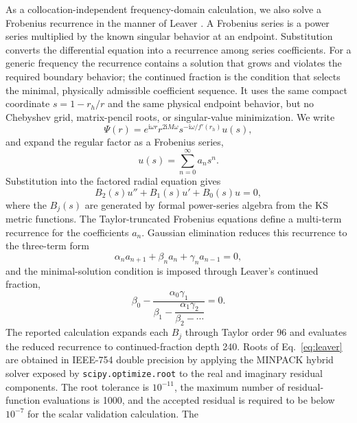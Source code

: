 \documentclass[12pt,a4paper]{article}
\newcommand{\ii}{\mathrm{i}}
\begin{document}
\color{blue}
As a collocation-independent frequency-domain calculation, we also solve a Frobenius
recurrence in the manner of Leaver \cite{Leaver1985,Nollert1993}.  A Frobenius
series is a power series multiplied by the known singular behavior at an
endpoint.  Substitution converts the differential equation into a recurrence
among series coefficients.  For a generic frequency the recurrence contains a
solution that grows and violates the required boundary behavior; the continued
fraction is the condition that selects the minimal, physically admissible
coefficient sequence.  It uses the same compact
coordinate \(s=1-r_h/r\) and the same physical endpoint behavior, but no
Chebyshev grid, matrix-pencil roots, or singular-value minimization. We write
\color{black}
\begin{equation*}
\Psi(r)=e^{\ii\omega r}r^{2\ii M\omega}s^{-\ii\omega/f'(r_h)}u(s),
\end{equation*}
\color{blue}
and expand the regular factor as a Frobenius series,
\color{black}
\begin{equation*}
u(s)=\sum_{n=0}^{\infty} a_n s^n.
\end{equation*}
Substitution into the factored radial equation gives
\begin{equation*}
B_2(s)u''+B_1(s)u'+B_0(s)u=0,
\end{equation*}
where the \(B_j(s)\) are generated by formal power-series algebra from the KS metric functions. The Taylor-truncated Frobenius equations define a multi-term recurrence for the coefficients \(a_n\). Gaussian elimination reduces this recurrence to the three-term form
\begin{equation*}
\alpha_n a_{n+1}+\beta_n a_n+\gamma_n a_{n-1}=0,
\end{equation*}
and the minimal-solution condition is imposed through Leaver's continued fraction,
\begin{equation}
\beta_0-\frac{\alpha_0\gamma_1}{\beta_1-\dfrac{\alpha_1\gamma_2}{\beta_2-\cdots}}=0.
\label{eq:leaver}
\end{equation}
\color{blue}
The reported calculation expands each \(B_j\) through Taylor order 96 and
evaluates the reduced recurrence to continued-fraction depth 240.  Roots of
Eq.~\eqref{eq:leaver} are obtained in IEEE-754 double precision by applying the
MINPACK hybrid solver exposed by \texttt{scipy.optimize.root} to the real and
imaginary residual components.  The root tolerance is \(10^{-11}\), the maximum
number of residual-function evaluations is 1000, and the accepted residual is
required to be below \(10^{-7}\) for the scalar validation calculation.  The
\end{document}
